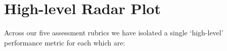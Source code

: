\section{High-level Radar Plot}
\label{section:high-level:radar-plot}
Across our five assessment rubrics we have isolated a single `high-level' performance metric for each which are:

